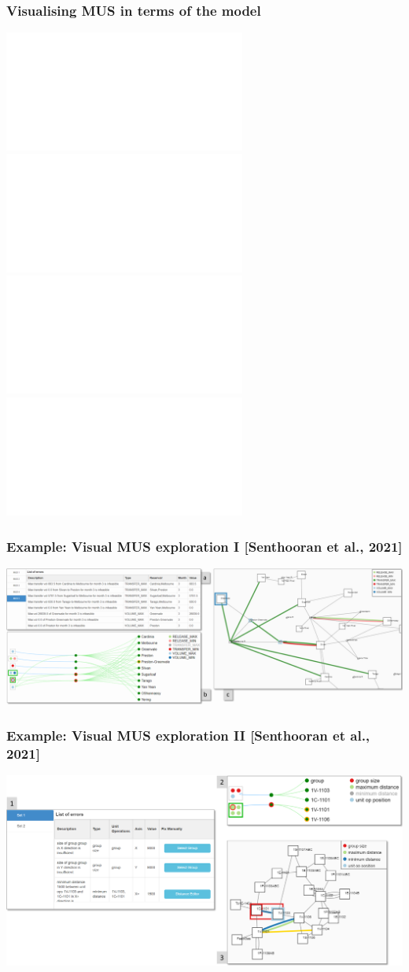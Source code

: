 \documentclass[dvipsnames,aspectratio=169]{beamer}
\begin{document}
\begin{frame}
\frametitle{Visualising MUS in terms of the model}

\includegraphics<1>[width=\textwidth]{images/latinD1.pdf}
\includegraphics<2>[width=\textwidth]{images/latinD2.pdf}
\includegraphics<3>[width=\textwidth]{images/latinD5.pdf}
\includegraphics<4>[width=\textwidth]{images/latinD6.pdf}

\end{frame}

\begin{frame}
  \frametitle{Example: Visual MUS exploration I [Senthooran et al., 2021]}
  
  \includegraphics[width=\textwidth]{images/conflict-visualisations-mw.png}
  
\end{frame}

\begin{frame}
  \frametitle{Example: Visual MUS exploration II [Senthooran et al., 2021]}
  
  \includegraphics[width=\textwidth]{images/conflict-visualisations.png}

\end{frame}
\end{document}
